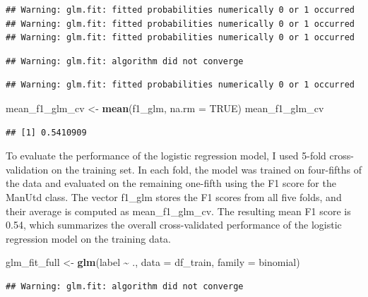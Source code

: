 \documentclass[
]{article}
\newenvironment{Shaded}{\begin{snugshade}}{\end{snugshade}}
\newcommand{\AttributeTok}[1]{\textcolor[rgb]{0.13,0.29,0.53}{#1}}
\newcommand{\ConstantTok}[1]{\textcolor[rgb]{0.56,0.35,0.01}{#1}}
\newcommand{\FunctionTok}[1]{\textcolor[rgb]{0.13,0.29,0.53}{\textbf{#1}}}
\newcommand{\NormalTok}[1]{#1}
\newcommand{\OtherTok}[1]{\textcolor[rgb]{0.56,0.35,0.01}{#1}}
\newcommand{\SpecialCharTok}[1]{\textcolor[rgb]{0.81,0.36,0.00}{\textbf{#1}}}
\begin{document}
\begin{verbatim}
## Warning: glm.fit: fitted probabilities numerically 0 or 1 occurred
## Warning: glm.fit: fitted probabilities numerically 0 or 1 occurred
## Warning: glm.fit: fitted probabilities numerically 0 or 1 occurred
\end{verbatim}

\begin{verbatim}
## Warning: glm.fit: algorithm did not converge
\end{verbatim}

\begin{verbatim}
## Warning: glm.fit: fitted probabilities numerically 0 or 1 occurred
\end{verbatim}

\begin{Shaded}
\begin{Highlighting}[]
\NormalTok{mean\_f1\_glm\_cv }\OtherTok{\textless{}{-}} \FunctionTok{mean}\NormalTok{(f1\_glm, }\AttributeTok{na.rm =} \ConstantTok{TRUE}\NormalTok{)}
\NormalTok{mean\_f1\_glm\_cv}
\end{Highlighting}
\end{Shaded}

\begin{verbatim}
## [1] 0.5410909
\end{verbatim}

To evaluate the performance of the logistic regression model, I used
5-fold cross-validation on the training set. In each fold, the model was
trained on four-fifths of the data and evaluated on the remaining
one-fifth using the F1 score for the ManUtd class. The vector f1\_glm
stores the F1 scores from all five folds, and their average is computed
as mean\_f1\_glm\_cv. The resulting mean F1 score is 0.54, which
summarizes the overall cross-validated performance of the logistic
regression model on the training data.

\begin{Shaded}
\begin{Highlighting}[]
\NormalTok{glm\_fit\_full }\OtherTok{\textless{}{-}} \FunctionTok{glm}\NormalTok{(label }\SpecialCharTok{\textasciitilde{}}\NormalTok{ ., }\AttributeTok{data =}\NormalTok{ df\_train, }\AttributeTok{family =}\NormalTok{ binomial)}
\end{Highlighting}
\end{Shaded}

\begin{verbatim}
## Warning: glm.fit: algorithm did not converge
\end{verbatim}
\end{document}
